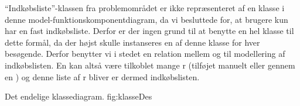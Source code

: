 ``Indkøbsliste''-klassen fra problemområdet er ikke repræsenteret af en
klasse i denne model-funktionskomponentdiagram, da vi besluttede for, at
brugere kun har en fast indkøbsliste. Derfor er der ingen grund til at
benytte en hel klasse til dette formål, da der højst skulle instanseres
en af denne klasse for hver besøgende. Derfor benytter vi i stedet en
relation mellem  og  til modellering
af indkøbslisten. En  kan altså være tilkoblet mange
r (tilføjet manuelt eller gennem en )
og denne liste af r bliver er dermed indkøbslisten.


	{Det endelige klassediagram.}
	{fig:klasseDes}
